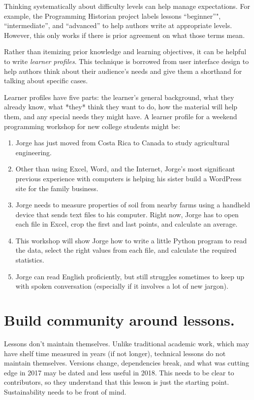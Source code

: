 \documentclass[10pt,letterpaper]{article}
\newcommand{\rulemajor}[1]{\section{#1}}
\begin{document}
Thinking systematically about difficulty levels can help manage expectations.
For example,
the Programming Historian project labels lessons ``beginner''",
``intermediate'',
and ``advanced''
to help authors write at appropriate levels.
However,
this only works if there is prior agreement on what those terms mean.

Rather than itemizing prior knowledge and learning objectives,
it can be helpful to write \emph{learner profiles}.
This technique is borrowed from user interface design
to help authors think about their audience's needs
and give them a shorthand for talking about specific cases.

Learner profiles have five parts:
the learner's general background,
what they already know,
what *they* think they want to do,
how the material will help them,
and any special needs they might have.
A learner profile for a weekend programming workshop for new college students might be:

\begin{enumerate}

\item
  Jorge has just moved from Costa Rica to Canada
  to study agricultural engineering.

\item
  Other than using Excel, Word, and the Internet,
  Jorge's most significant previous experience with computers is
  helping his sister build a WordPress site for the family business.

\item
  Jorge needs to measure properties of soil from nearby farms
  using a handheld device that sends text files to his computer.
  Right now, Jorge has to open each file in Excel,
  crop the first and last points,
  and calculate an average.

\item
  This workshop will show Jorge how to write a little Python program
  to read the data,
  select the right values from each file,
  and calculate the required statistics.

\item
  Jorge can read English proficiently,
  but still struggles sometimes to keep up with spoken conversation
  (especially if it involves a lot of new jargon).

\end{enumerate}

\rulemajor{Build community around lessons.}

Lessons don't maintain themselves. 
Unlike traditional academic work, 
which may have shelf time measured 
in years (if not longer), 
technical lessons do not maintain themselves. 
Versions change, dependencies break, 
and what was cutting edge in 2017 may be dated 
and less useful in 2018. 
This needs to be clear to contributors, 
so they understand that this lesson is just 
the starting point. 
Sustainability needs to be front of mind.
\end{document}
